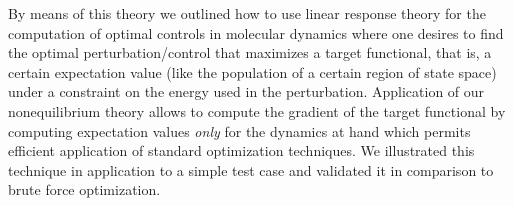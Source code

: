 \documentclass[]{tMPH2e}
\begin{document}
By means of this theory we outlined how to use linear response theory for the computation of optimal controls in molecular dynamics where one desires to find the optimal perturbation/control that maximizes a target functional, that is, a certain expectation value (like the population of a certain region of state space) under a constraint on the energy used in the perturbation. Application of our nonequilibrium theory allows to compute the gradient of the target functional by computing expectation values \emph{only} for the dynamics at hand which permits efficient application of standard optimization techniques. We illustrated this technique in application to a simple test case and validated it in comparison to brute force optimization.  













\end{document}
